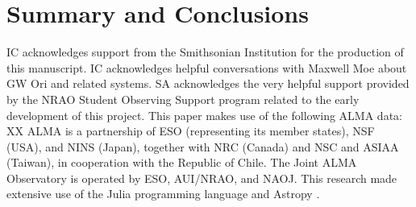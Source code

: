 \documentclass[twocolumn]{aastex6}
\begin{document}
\section{Summary and Conclusions} \label{sec:summary}

\acknowledgments
IC acknowledges support from the Smithsonian Institution for the production of this manuscript. IC acknowledges helpful conversations with Maxwell Moe about GW Ori and related systems.  SA acknowledges the very helpful support provided by the NRAO Student Observing Support program related to the early development of this project.  This paper makes use of the following ALMA data: XX  ALMA is a partnership of ESO (representing its member states), NSF (USA), and NINS (Japan), together with NRC (Canada) and NSC and ASIAA (Taiwan), in cooperation with the Republic of Chile.  The Joint ALMA Observatory is operated by ESO, AUI/NRAO, and NAOJ.  This research made extensive use of the Julia programming language \citep{julia12} and Astropy \citep{astropy13}.



\end{document}
